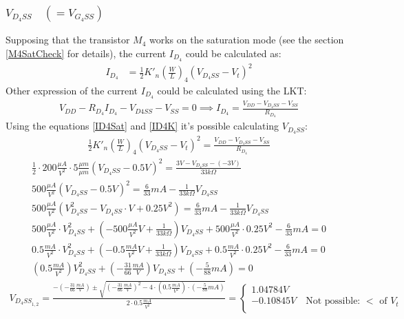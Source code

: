 \subsubsection{$V_{D_4SS}\quad (=V_{G_4SS})$}
Supposing that the transistor $M_4$ works on the saturation mode (see the section \ref{M4SatCheck} for details), the current $I_{D_4}$ could be calculated as:\\
\begin{align}
I_{D_4} &= \frac{1}{2}{K'}_n \left(\frac{W}{L}\right)_4 (V_{D_4SS} - V_t)^2 \label{ID4Sat}
\end{align}
Other expression of the current $I_{D_4}$ could be calculated using the LKT:\\
\begin{align}
V_{DD}-R_{D_4}I_{D_4}-V_{D4SS}-V_{SS} = 0 \implies
I_{D_4} = \frac{V_{DD} - V_{D_4SS} - V_{SS}}{R_{D_4}}\label{ID4K}
\end{align}
Using the equations \ref{ID4Sat} and \ref{ID4K} it's possible calculating $V_{D_4SS}$:\\
\begin{align}
\frac{1}{2}{K'}_n \left(\frac{W}{L}\right)_4 (V_{D_4SS} - V_t)^2 = \frac{V_{DD} - V_{D_4SS} - V_{SS}}{R_{D_4}}
\end{align}
\begin{align}
\frac{1}{2}\cdot 200 \frac{\mu A}{V^2} \cdot 5 \frac{\mu m}{\mu m} (V_{D_4SS} - 0.5V)^2 = \frac{3V - V_{D_4SS} - (-3V)}{33k\Omega}\\
500 \frac{\mu A}{V^2} (V_{D_4SS} -0.5V)^2 = \frac{6}{33}mA-\frac{1}{33k\Omega}V_{D_4SS}\\
500 \frac{\mu A}{V^2} (V_{D_4SS}^2- V_{D_4SS}\cdot V +0.25V^2) = \frac{6}{33}mA-\frac{1}{33k\Omega}V_{D_4SS}\\
500 \frac{\mu A}{V^2} \cdot V_{D_4SS}^2 + \left(-500 \frac{\mu A}{V^2}V + \frac{1}{33k\Omega}\right) V_{D_4SS} + 500 \frac{\mu A}{V^2} \cdot 0.25V^2 -\frac{6}{33}mA = 0\\
0.5 \frac{mA}{V^2} \cdot V_{D_4SS}^2 + \left(-0.5 \frac{mA}{V^2}V + \frac{1}{33k\Omega}\right) V_{D_4SS} + 0.5 \frac{mA}{V^2} \cdot 0.25V^2 -\frac{6}{33}mA = 0\\
\left(0.5 \frac{mA}{V^2}\right) V_{D_4SS}^2 + \left( -\frac{31}{66}\frac{mA}{V}\right) V_{D_4SS} + \left(-\frac{5}{88}mA\right) = 0
\end{align}
\begin{align}
V_{{D_{4}SS}_{1,2}} = \frac{-\left( -\frac{31}{66}\frac{mA}{V}\right)\pm \sqrt{\left(-\frac{31}{66}\frac{mA}{V}\right)^2-4\cdot\left(0.5 \frac{mA}{V^2}\right)\cdot\left(-\frac{5}{88}mA\right)}}{2\cdot0.5 \frac{mA}{V^2}} = 
\left\{
\begin{array}{l}
1.04784V \label{VD4SS}\\
-0.10845V \quad \text{Not possible: }<\text{ of } V_t\\
\end{array}
\right. 
\end{align}

